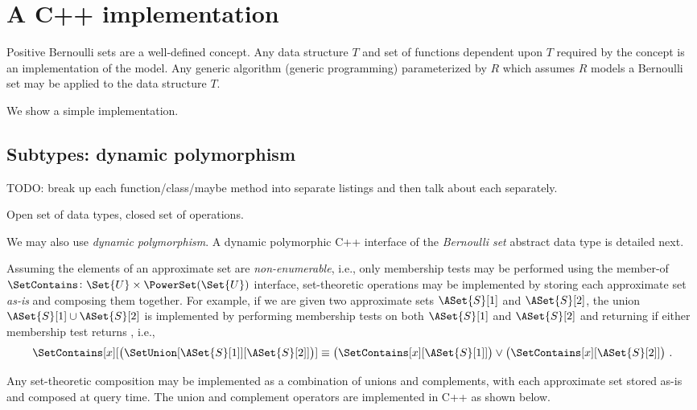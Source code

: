 \documentclass[ ../main.tex]{subfiles}
\begin{document}
\section{A C++ implementation}
\label{sec:impl}
Positive Bernoulli sets are a well-defined concept. Any data structure $T$ and set of functions dependent upon $T$ required by the concept is an implementation of the model.
Any generic algorithm (generic programming) parameterized by $R$ which assumes $R$ models a Bernoulli set may be applied to the data structure $T$.

We show a simple implementation.

\subsection{Subtypes: dynamic polymorphism}
TODO: break up each function/class/maybe method into separate listings and then
talk about each separately.

Open set of data types, closed set of operations.

We may also use \emph{dynamic polymorphism}. A dynamic polymorphic C++
interface of the \emph{Bernoulli set} abstract data type is detailed next.


Assuming the elements of an approximate set are \emph{non-enumerable}, i.e., only membership tests may be performed using the member-of $\SetContains \colon \Set{U} \times \PowerSet(\Set{U})$ interface, set-theoretic operations may be implemented by storing each approximate set \emph{as-is} and composing them together. For example, if we are given two approximate sets $\ASet{S}[1]$ and $\ASet{S}[2]$, the union $\ASet{S}[1] \cup \ASet{S}[2]$ is implemented by performing membership tests on both $\ASet{S}[1]$ and $\ASet{S}[2]$ and returning \True if either membership test returns \True, i.e.,
\begin{equation}
\SetContains[x][\left(\SetUnion[\ASet{S}[1]][\ASet{S}[2]]\right)] \equiv \left(\SetContains[x][\ASet{S}[1]]\right) \lor \left(\SetContains[x][\ASet{S}[2]]\right)\,.
\end{equation}

Any set-theoretic composition may be implemented as a combination of unions and complements, with each approximate set stored as-is and composed at query time. The union and complement operators are implemented in C++ as shown below.
\end{document}

